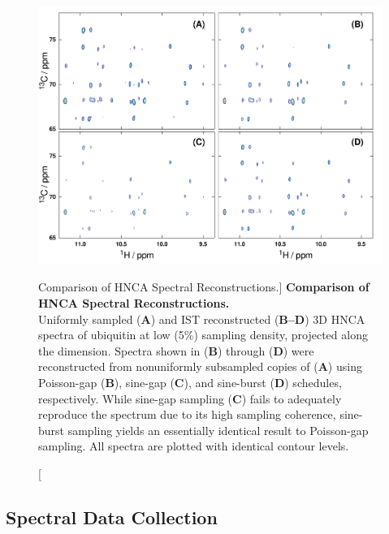 \begin{figure}[ht!]
\includegraphics[width=6in]{figs/dgs/07-hnca.png}
\caption
      [Comparison of HNCA Spectral Reconstructions.]{
  {\bf Comparison of HNCA Spectral Reconstructions.}
  \\
  Uniformly sampled ({\bf A}) and IST reconstructed ({\bf B--D}) 3D HNCA
  spectra of ubiquitin at low (5\%) sampling density, projected along the
  \nnmr{} dimension. Spectra shown in ({\bf B}) through ({\bf D}) were
  reconstructed from nonuniformly subsampled copies of ({\bf A}) using
  Poisson-gap ({\bf B}), sine-gap ({\bf C}), and sine-burst ({\bf D})
  schedules, respectively. While sine-gap sampling ({\bf C}) fails to
  adequately reproduce the spectrum due to its high sampling coherence,
  sine-burst sampling yields an essentially identical result to Poisson-gap
  sampling. All spectra are plotted with identical contour levels.
}
\label{figure.2.7}
\end{figure}

\subsection{Spectral Data Collection}

